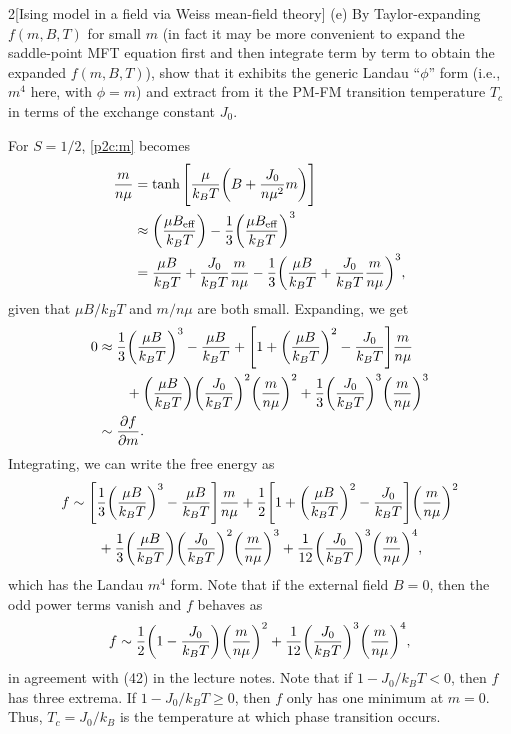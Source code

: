 \documentclass[12pt]{article}
\begin{document}
\begin{problem}{2}[Ising model in a field via Weiss mean-field theory]
(e) By Taylor-expanding $f(m,B,T)$ for small $m$ (in fact it may be more
convenient to expand the saddle-point MFT equation first and then integrate term
by term to obtain the expanded $f(m,B,T)$), show that it exhibits the generic
Landau ``$\phi$'' form (i.e., $m^4$ here, with $\phi=m$) and extract from it the
PM-FM transition temperature $T_c$ in terms of the exchange constant $J_0$.
\begin{solution}
    For $S=1/2$, \eqref{p2c:m} becomes
\begin{align}\label{p2e:m}
    \frac{m}{n\mu}
    &=\tanh\qty[\frac{\mu}{k_BT}\qty(B+\frac{J_0}{n\mu^2}m)] \notag\\
    &\approx \qty(\frac{\mu B_{\text{eff}}}{k_BT})
    -\frac13\qty(\frac{\mu B_{\text{eff}}}{k_BT})^3\notag\\
    &=\frac{\mu B}{k_BT}+\frac{J_0}{k_BT}\frac{m}{n\mu}
    -\frac13\qty(\frac{\mu B}{k_BT}+\frac{J_0}{k_BT}\frac{m}{n\mu})^3,
\end{align}
given that $\mu B/k_BT$ and $m/n\mu$ are both small. Expanding, we get
\begin{align}
    0
    &\approx\frac13\qty(\frac{\mu B}{k_BT})^3-\frac{\mu B}{k_BT}
    +\qty[1+\qty(\frac{\mu B}{k_BT})^2-\frac{J_0}{k_BT}]\frac{m}{n\mu}\notag\\
    &\qquad+\qty(\frac{\mu
    B}{k_BT})\qty(\frac{J_0}{k_BT})^2\qty(\frac{m}{n\mu})^2
    +\frac13\qty(\frac{J_0}{k_BT})^3\qty(\frac{m}{n\mu})^3\notag\\
    &\sim\frac{\partial f}{\partial m}.
\end{align}
Integrating, we can write the free energy as
\begin{align}\label{p2e:f}
    f
    &\sim\qty[\frac13\qty(\frac{\mu B}{k_BT})^3-\frac{\mu B}{k_BT}]\frac{m}{n\mu}
    +\frac12\qty[1+\qty(\frac{\mu
    B}{k_BT})^2-\frac{J_0}{k_BT}]\qty(\frac{m}{n\mu})^2\notag\\
    &\qquad+\frac13\qty(\frac{\mu B}{k_BT})\qty(\frac{J_0}{k_BT})^2
    \qty(\frac{m}{n\mu})^3
    +\frac1{12}\qty(\frac{J_0}{k_BT})^3\qty(\frac{m}{n\mu})^4,
\end{align}
which has the Landau $m^4$ form. Note 
that if the external field $B=0$, then the odd power terms vanish and $f$ 
behaves as
\begin{equation}\label{p2e:fB0}
    f\sim\frac12\qty(1-\frac{J_0}{k_BT})\qty(\frac{m}{n\mu})^2
    +\frac1{12}\qty(\frac{J_0}{k_BT})^3\qty(\frac{m}{n\mu})^4,
\end{equation}
in agreement with (42) in the lecture notes. Note that if $1-J_0/k_BT<0$, then 
$f$ has three extrema. If $1-J_0/k_BT\geq 0$, then $f$ only has one minimum at 
$m=0$. Thus, $T_c=J_0/k_B$ is the temperature at which phase transition occurs.
\end{solution}


\end{problem}
\end{document}
